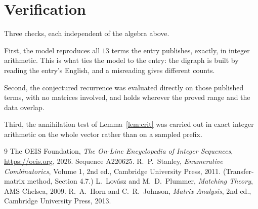\documentclass[11pt,a4paper]{article}
\theoremstyle{plain}
\theoremstyle{definition}
\begin{document}
\section{Verification}

Three checks, each independent of the algebra above.

First, the model reproduces all $13$ terms the entry publishes, exactly, in integer
arithmetic. This is what ties the model to the entry: the digraph is built by reading the
entry's English, and a misreading gives different counts.

Second, the conjectured recurrence was evaluated directly on those published terms, with no
matrices involved, and holds wherever the proved range and the data overlap.

Third, the annihilation test of Lemma~\ref{lem:crit} was carried out in exact integer
arithmetic on the whole vector rather than on a sampled prefix.

\begin{thebibliography}{9}
 The OEIS Foundation, \emph{The On-Line Encyclopedia of Integer
Sequences}, \url{https://oeis.org}, 2026. Sequence A220625.
 R.~P.~Stanley, \emph{Enumerative Combinatorics}, Volume 1, 2nd ed.,
Cambridge University Press, 2011. (Transfer-matrix method, Section 4.7.)
 L.~Lov\'asz and M.~D.~Plummer, \emph{Matching Theory}, AMS Chelsea,
2009.
 R.~A.~Horn and C.~R.~Johnson, \emph{Matrix Analysis}, 2nd ed., Cambridge
University Press, 2013.
\end{thebibliography}
\end{document}
